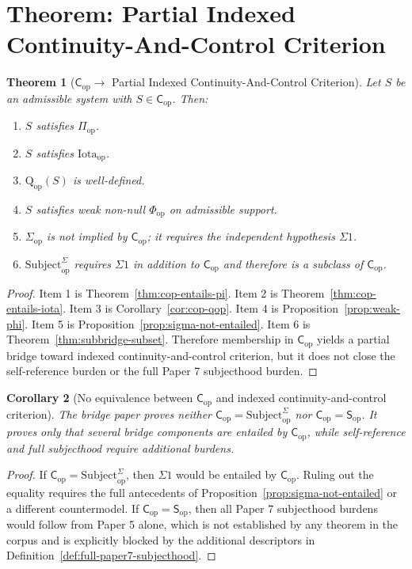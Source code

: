 \documentclass[11pt,a4paper]{article}
\newtheorem{theorem}{Theorem}[section]
\newtheorem{corollary}[theorem]{Corollary}
\theoremstyle{definition}
\newcommand{\Cop}{\mathsf{C}_{\mathrm{op}}}
\newcommand{\Subop}{\mathsf{S}_{\mathrm{op}}}
\newcommand{\Subbridge}{\mathrm{Subject}^{\Sigma}_{\mathrm{op}}}
\newcommand{\Qop}{\mathrm{Q}_{\mathrm{op}}}
\newcommand{\Sigmaop}{\Sigma_{\mathrm{op}}}
\newcommand{\Piop}{\Pi_{\mathrm{op}}}
\newcommand{\Iotaop}{\mathrm{Iota}_{\mathrm{op}}}
\newcommand{\Phiop}{\Phi_{\mathrm{op}}}
\begin{document}
\section{Theorem: Partial Indexed Continuity-And-Control Criterion}

\begin{theorem}[$\Cop \to$ Partial Indexed Continuity-And-Control Criterion]\label{thm:main-partial-subjecthood}
Let $S$ be an admissible system with $S\in\Cop$. Then:
\begin{enumerate}[leftmargin=1.5em]
\item $S$ satisfies $\Piop$.
\item $S$ satisfies $\Iotaop$.
\item $\Qop(S)$ is well-defined.
\item $S$ satisfies weak non-null $\Phiop$ on admissible support.
\item $\Sigmaop$ is not implied by $\Cop$; it requires the independent hypothesis $\Sigma1$.
\item $\Subbridge$ requires $\Sigma1$ in addition to $\Cop$ and therefore is a subclass of $\Cop$.
\end{enumerate}
\end{theorem}

\begin{proof}
Item 1 is Theorem~\ref{thm:cop-entails-pi}. Item 2 is Theorem~\ref{thm:cop-entails-iota}. Item 3 is Corollary~\ref{cor:cop-qop}. Item 4 is Proposition~\ref{prop:weak-phi}. Item 5 is Proposition~\ref{prop:sigma-not-entailed}. Item 6 is Theorem~\ref{thm:subbridge-subset}. Therefore membership in $\Cop$ yields a partial bridge toward indexed continuity-and-control criterion, but it does not close the self-reference burden or the full Paper 7 subjecthood burden.
\end{proof}

\begin{corollary}[No equivalence between $\Cop$ and indexed continuity-and-control criterion]\label{cor:no-equivalence}
The bridge paper proves neither $\Cop=\Subbridge$ nor $\Cop=\Subop$. It proves only that several bridge components are entailed by $\Cop$, while self-reference and full subjecthood require additional burdens.
\end{corollary}

\begin{proof}
If $\Cop=\Subbridge$, then $\Sigma1$ would be entailed by $\Cop$. Ruling out the equality requires the full antecedents of Proposition~\ref{prop:sigma-not-entailed} or a different countermodel. If $\Cop=\Subop$, then all Paper 7 subjecthood burdens would follow from Paper 5 alone, which is not established by any theorem in the corpus and is explicitly blocked by the additional descriptors in Definition~\ref{def:full-paper7-subjecthood}.
\end{proof}
\end{document}
